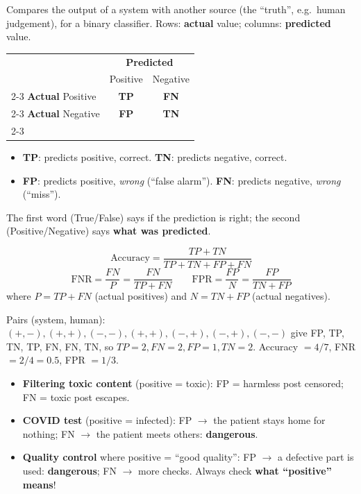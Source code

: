 \documentclass[11pt,a4paper,openany]{book}
\begin{document}
\begin{defnbox}[title={Confusion matrix}]
Compares the output of a system with another source (the ``truth'', e.g.\ human judgement), for
a binary classifier. Rows: \textbf{actual} value; columns: \textbf{predicted} value.
\begin{center}
\begin{tabular}{l|c|c|}
\multicolumn{1}{c}{} & \multicolumn{2}{c}{\textbf{Predicted}} \\
\multicolumn{1}{c}{} & \multicolumn{1}{c}{Positive} & \multicolumn{1}{c}{Negative} \\ \cline{2-3}
\textbf{Actual} Positive & \textcolor{greenColor}{\textbf{TP}} & \textcolor{redColor}{\textbf{FN}} \\ \cline{2-3}
\textbf{Actual} Negative & \textcolor{redColor}{\textbf{FP}} & \textcolor{greenColor}{\textbf{TN}} \\ \cline{2-3}
\end{tabular}
\end{center}
\begin{itemize}
  \item \textbf{TP}: predicts positive, correct. \textbf{TN}: predicts negative, correct.
  \item \textbf{FP}: predicts positive, \emph{wrong} (``false alarm'').
        \textbf{FN}: predicts negative, \emph{wrong} (``miss'').
\end{itemize}
The first word (True/False) says if the prediction is right; the second (Positive/Negative) says
\textbf{what was predicted}.
\end{defnbox}

\begin{propbox}[title={Basic metrics}]
\[
\text{Accuracy} = \frac{TP+TN}{TP+TN+FP+FN}
\]
\[
\text{FNR} = \frac{FN}{P} = \frac{FN}{TP+FN}
\qquad
\text{FPR} = \frac{FP}{N} = \frac{FP}{TN+FP}
\]
where $P = TP+FN$ (actual positives) and $N = TN+FP$ (actual negatives).
\end{propbox}

\begin{exbox}[title={Offensive text detector}]
Pairs (system, human): $(+,-), (+,+), (-,-), (+,+), (-,+), (-,+), (-,-)$ give FP, TP, TN, TP,
FN, FN, TN, so $TP=2, FN=2, FP=1, TN=2$. Accuracy $=4/7$, FNR $=2/4=0.5$, FPR $=1/3$.
\end{exbox}

\begin{warnbox}[title={Which error matters depends on the context}]
\begin{itemize}
  \item \textbf{Filtering toxic content} (positive = toxic): FP = harmless post censored; FN =
        toxic post escapes.
  \item \textbf{COVID test} (positive = infected): FP $\to$ the patient stays home for nothing;
        FN $\to$ the patient meets others: \textbf{dangerous}.
  \item \textbf{Quality control} where positive = ``good quality'': FP $\to$ a defective part is
        used: \textbf{dangerous}; FN $\to$ more checks. Always check \textbf{what ``positive''
        means}!
\end{itemize}
\end{warnbox}
\end{document}
